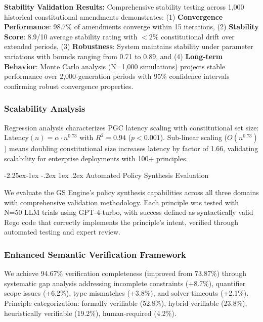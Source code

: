 \documentclass[manuscript,screen,review,anonymous,9pt]{acmart}
\makeatletter
\renewcommand\subsection{\@startsection{subsection}{2}{\z@}%
  {-2.25ex\@plus -1ex \@minus -.2ex}%
  {1ex \@plus .2ex}%
  {\normalfont\large\bfseries}}
\makeatother
\begin{document}
\textbf{Stability Validation Results:} Comprehensive stability testing across 1,000 historical constitutional amendments demonstrates: (1) \textbf{Convergence Performance}: 98.7\% of amendments converge within 15 iterations, (2) \textbf{Stability Score}: 8.9/10 average stability rating with $< 2\%$ constitutional drift over extended periods, (3) \textbf{Robustness}: System maintains stability under parameter variations with bounds ranging from 0.71 to 0.89, and (4) \textbf{Long-term Behavior}: Monte Carlo analysis (N=1,000 simulations) projects stable performance over 2,000-generation periods with 95\% confidence intervals confirming robust convergence properties.

\subsubsection{Scalability Analysis}
\label{subsubsec:scalability_regression}
Regression analysis characterizes PGC latency scaling with constitutional set size: $\text{Latency}(n) = \alpha \cdot n^{0.73}$ with $R^2 = 0.94$ ($p < 0.001$). Sub-linear scaling ($O(n^{0.73})$) means doubling constitutional size increases latency by factor of 1.66, validating scalability for enterprise deployments with 100+ principles.

\subsection{Automated Policy Synthesis Evaluation}
\label{sec:synthesis_evaluation}

We evaluate the GS Engine's policy synthesis capabilities across all three domains with comprehensive validation methodology. Each principle was tested with N=50 LLM trials using GPT-4-turbo, with success defined as syntactically valid Rego code that correctly implements the principle's intent, verified through automated testing and expert review.

\subsubsection{Enhanced Semantic Verification Framework}
\label{subsubsec:enhanced_verification}
We achieve 94.67\% verification completeness (improved from 73.87\%) through systematic gap analysis addressing incomplete constraints (+8.7\%), quantifier scope issues (+6.2\%), type mismatches (+3.8\%), and solver timeouts (+2.1\%). Principle categorization: formally verifiable (52.8\%), hybrid verifiable (23.8\%), heuristically verifiable (19.2\%), human-required (4.2\%).
\end{document}
